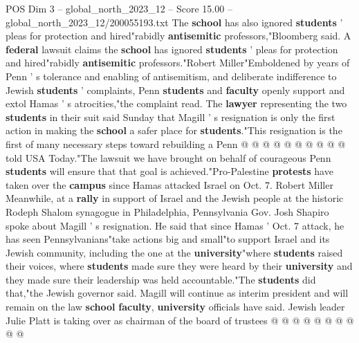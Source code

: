 \begin{textsample}{POS Dim 3 – global\_north\_2023\_12 – Score 15.00 – global\_north\_2023\_12/200055193.txt}
The \textbf{school} has also ignored \textbf{students} ' pleas for protection and hired"rabidly \textbf{antisemitic} professors,"Bloomberg said.
A \textbf{federal} lawsuit claims the \textbf{school} has ignored \textbf{students} ' pleas for protection and hired"rabidly \textbf{antisemitic} professors."Robert Miller"Emboldened by years of Penn ' s tolerance and enabling of antisemitism, and deliberate indifference to Jewish \textbf{students} ' complaints, Penn \textbf{students} and \textbf{faculty} openly support and extol Hamas ' s atrocities,"the complaint read.
The \textbf{lawyer} representing the two \textbf{students} in their suit said Sunday that Magill ' s resignation is only the first action in making the \textbf{school} a safer place for \textbf{students}."This resignation is the first of many necessary steps toward rebuilding a Penn @ @ @ @ @ @ @ @ @ @ told USA Today."The lawsuit we have brought on behalf of courageous Penn \textbf{students} will ensure that that goal is achieved."Pro-Palestine \textbf{protests} have taken over the \textbf{campus} since Hamas attacked Israel on Oct. 7.
Robert Miller Meanwhile, at a \textbf{rally} in support of Israel and the Jewish people at the historic Rodeph Shalom synagogue in Philadelphia, Pennsylvania Gov.
Josh Shapiro spoke about Magill ' s resignation.
He said that since Hamas ' Oct. 7 attack, he has seen Pennsylvanians"take actions big and small"to support Israel and its Jewish community, including the one at the \textbf{university}"where \textbf{students} raised their voices, where \textbf{students} made sure they were heard by their \textbf{university} and they made sure their leadership was held accountable."The \textbf{students} did that,"the Jewish governor said.
Magill will continue as interim president and will remain on the law \textbf{school} \textbf{faculty}, \textbf{university} officials have said.
Jewish leader Julie Platt is taking over as chairman of the board of trustees @ @ @ @ @ @ @ @ @ @

\end{textsample}
